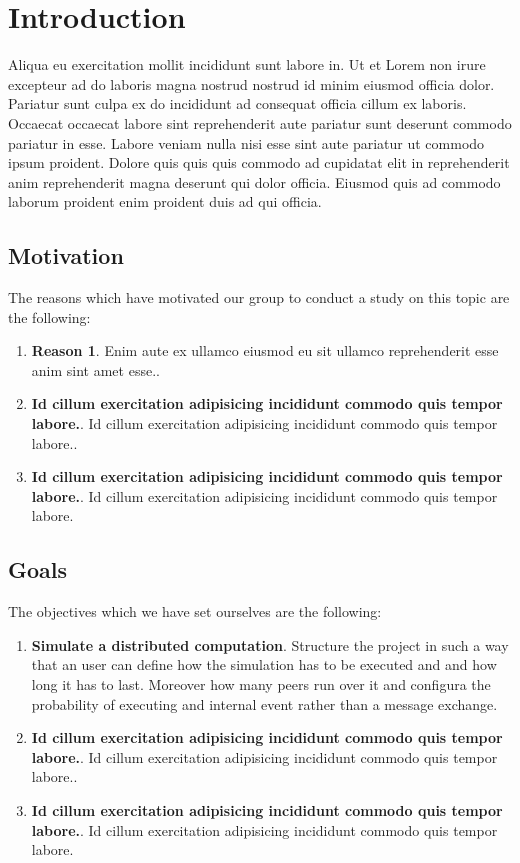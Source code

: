 \documentclass[12pt]{article}
\begin{document}


\vspace{3cm}

\section{Introduction}

Aliqua eu exercitation mollit incididunt sunt labore in. Ut et Lorem non irure excepteur ad do laboris magna nostrud nostrud id minim eiusmod officia dolor. Pariatur sunt culpa ex do incididunt ad consequat officia cillum ex laboris. Occaecat occaecat labore sint reprehenderit aute pariatur sunt deserunt commodo pariatur in esse. Labore veniam nulla nisi esse sint aute pariatur ut commodo ipsum proident. Dolore quis quis quis commodo ad cupidatat elit in reprehenderit anim reprehenderit magna deserunt qui dolor officia. Eiusmod quis ad commodo laborum proident enim proident duis ad qui officia.

\subsection*{Motivation}

The reasons which have motivated our group to conduct a study on this topic are the following:

\begin{enumerate}
\item \textbf{Reason 1}. Enim aute ex ullamco eiusmod eu sit ullamco reprehenderit esse anim sint amet esse..
\item \textbf{Id cillum exercitation adipisicing incididunt commodo quis tempor labore.}. Id cillum exercitation adipisicing incididunt commodo quis tempor labore..
\item \textbf{Id cillum exercitation adipisicing incididunt commodo quis tempor labore.}. Id cillum exercitation adipisicing incididunt commodo quis tempor labore.
\end{enumerate}

\subsection*{Goals}

The objectives which we have set ourselves are the following:
\begin{enumerate}
\item \textbf{Simulate a distributed computation}. Structure the project in such a way that an user can define how the simulation has to be executed and and how long it has to last. Moreover how many peers run over it and configura the probability of executing and internal event rather than a message exchange.

\item \textbf{Id cillum exercitation adipisicing incididunt commodo quis tempor labore.}. Id cillum exercitation adipisicing incididunt commodo quis tempor labore..
\item \textbf{Id cillum exercitation adipisicing incididunt commodo quis tempor labore.}. Id cillum exercitation adipisicing incididunt commodo quis tempor labore.
\end{enumerate}
\end{document}
